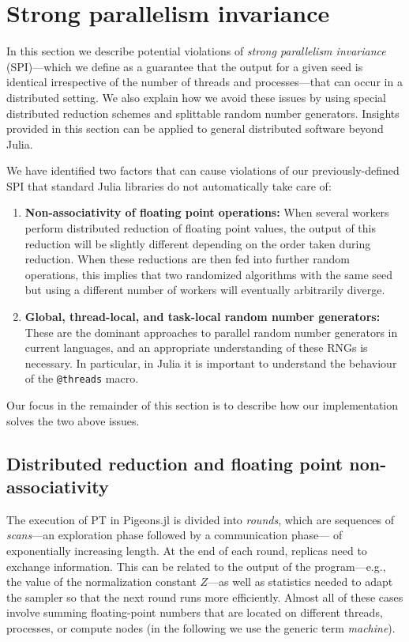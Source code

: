\section{Strong parallelism invariance}\label{sec:PI_causes}

In this section we describe potential violations of \emph{strong 
parallelism invariance} (SPI)---which we define as a guarantee that the output 
for a given seed is identical irrespective of the number of threads and 
processes---that can occur in a distributed setting. We also explain how we 
avoid these issues by using special distributed reduction schemes and 
splittable random number generators. Insights provided in this section 
can be applied to general distributed software beyond Julia.

 
We have identified two factors that can cause violations of our previously-defined 
SPI that standard Julia libraries 
do not automatically take care of:
\begin{enumerate}   
  \item \textbf{Non-associativity of floating point operations:} When 
  several workers perform distributed reduction of floating point values, 
  the output of this reduction will be slightly different depending on the order taken 
  during reduction. 
  When these reductions are then fed into further random operations, 
  this implies that two randomized algorithms with the same seed but using a 
  different number of workers will eventually arbitrarily diverge.

  \item \textbf{Global, thread-local, and task-local random number generators:} 
  These are the dominant approaches to parallel random number generators in current languages, 
  and an appropriate understanding of these RNGs is necessary. In particular, 
  in Julia it is important to understand the behaviour of the \texttt{@threads} macro.
\end{enumerate}
Our focus in the remainder of this section is to describe how our implementation 
solves the two above issues.


\subsection{Distributed reduction and floating point non-associativity}
The execution of PT in Pigeons.jl is divided into \emph{rounds}, which are
sequences of \emph{scans}---an exploration phase followed by a communication phase---%
of exponentially increasing length. At the end of each round,
replicas need to exchange information. This can be related to the output of the 
program---e.g., the value of the normalization constant $Z$---as well as statistics 
needed to adapt the sampler so that the next round runs more efficiently.
Almost all of these cases involve summing floating-point numbers that are 
located on different threads, processes, or compute nodes (in the following we use 
the generic term \emph{machine}).

